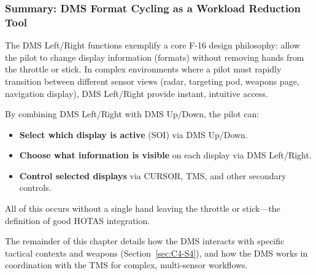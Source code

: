 \documentclass[11pt,a4paper]{article}
\begin{document}
\subsubsection{Summary: DMS Format Cycling as a Workload Reduction Tool}
\label{sec:C4-S3-S5}

The DMS Left/Right functions exemplify a core F-16 design philosophy: allow the pilot to change display information (formats) without removing hands from the throttle or stick. In complex environments where a pilot must rapidly transition between different sensor views (radar, targeting pod, weapons page, navigation display), DMS Left/Right provide instant, intuitive access.

By combining DMS Left/Right with DMS Up/Down, the pilot can:

\begin{itemize}

\item \textbf{Select which display is active} (SOI) via DMS Up/Down.

\item \textbf{Choose what information is visible} on each display via DMS Left/Right.

\item \textbf{Control selected displays} via CURSOR, TMS, and other secondary controls.

\end{itemize}

All of this occurs without a single hand leaving the throttle or stick—the definition of good HOTAS integration.

The remainder of this chapter details how the DMS interacts with specific tactical contexts and weapons (Section~\ref{sec:C4-S4}), and how the DMS works in coordination with the TMS for complex, multi-sensor workflows.

\end{document}

